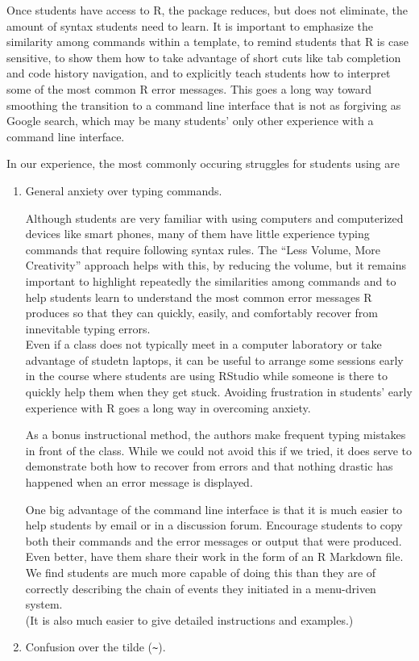 Once students have access to R, the  package reduces, but
does not eliminate, the amount of syntax students need to learn. It is
important to emphasize the similarity among commands within a template,
to remind students that R is case sensitive, to show them how to take
advantage of short cuts like tab completion and code history navigation,
and to explicitly teach students how to interpret some of the most
common R error messages. This goes a long way toward smoothing the
transition to a command line interface that is not as forgiving as
Google search, which may be many students' only other experience with a
command line interface.

In our experience, the most commonly occuring struggles for students
using  are

\begin{enumerate}
\def\labelenumi{\arabic{enumi}.}
\item
  General anxiety over typing commands.

  Although students are very familiar with using computers and
  computerized devices like smart phones, many of them have little
  experience typing commands that require following syntax rules. The
  ``Less Volume, More Creativity'' approach helps with this, by reducing
  the volume, but it remains important to highlight repeatedly the
  similarities among commands and to help students learn to understand
  the most common error messages R produces so that they can quickly,
  easily, and comfortably recover from innevitable typing errors.\\
  Even if a class does not typically meet in a computer laboratory or
  take advantage of studetn laptops, it can be useful to arrange some
  sessions early in the course where students are using RStudio while
  someone is there to quickly help them when they get stuck. Avoiding
  frustration in students' early experience with R goes a long way in
  overcoming anxiety.

  As a bonus instructional method, the authors make frequent typing
  mistakes in front of the class. While we could not avoid this if we
  tried, it does serve to demonstrate both how to recover from errors
  and that nothing drastic has happened when an error message is
  displayed.

  One big advantage of the command line interface is that it is much
  easier to help students by email or in a discussion forum. Encourage
  students to copy both their commands and the error messages or output
  that were produced.\\
  Even better, have them share their work in the form of an R Markdown
  file. We find students are much more capable of doing this than they
  are of correctly describing the chain of events they initiated in a
  menu-driven system.\\
  (It is also much easier to give detailed instructions and examples.)
\item
  Confusion over the tilde (\texttt{\textasciitilde{}}).


\end{enumerate}
